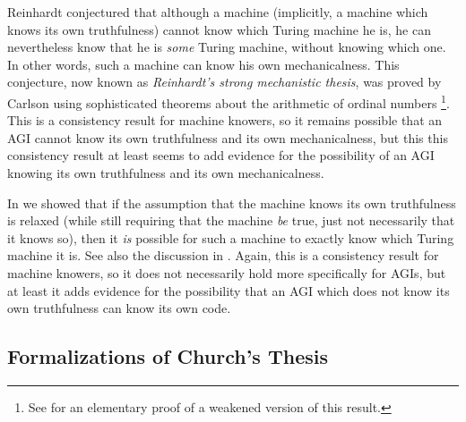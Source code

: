 \documentclass[runningheads]{llncs}
\begin{document}
Reinhardt conjectured that although a machine (implicitly, a machine which
knows its own truthfulness) cannot know which Turing machine he is, he can
nevertheless know that he is \emph{some} Turing machine, without knowing
which one. In other words, such a machine can know his own mechanicalness.
This conjecture, now known as \emph{Reinhardt's strong mechanistic thesis}, was
proved by Carlson \cite{carlson} using sophisticated theorems about the
arithmetic of ordinal numbers \cite{carlson1999}\footnote{See
\cite{alexander2015fast} for an elementary proof of a weakened version of
this result.}.
This is a consistency result for machine knowers, so it remains possible
that an AGI cannot know its own truthfulness and its own mechanicalness, but
this this consistency result at least seems to add evidence for
the possibility of an AGI knowing its own truthfulness and its own mechanicalness.

In \cite{alexander2014machine} we showed that if the assumption that the
machine knows its own truthfulness is relaxed (while still requiring that
the machine \emph{be} true, just not necessarily that it knows so),
then it \emph{is} possible for such a machine to exactly know which
Turing machine it is. See also the discussion in \cite{aldini2015theory}.
Again, this is a consistency result for machine knowers, so it does not
necessarily hold more specifically for AGIs, but at least it adds evidence
for the possibility that an AGI which does not know its own truthfulness
can know its own code.



\subsection{Formalizations of Church's Thesis}
\end{document}
